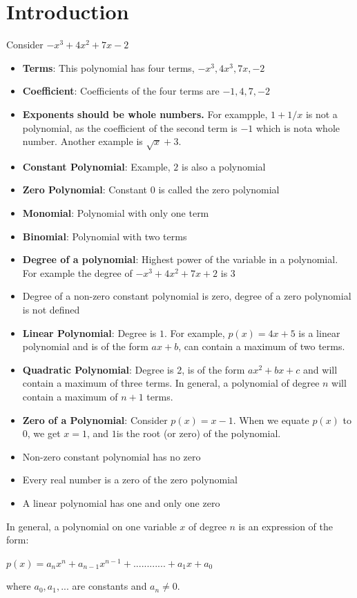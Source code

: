 \documentclass{book}
\begin{document}
	\section{Introduction}
	Consider $-x^3 + 4x^2 +7x -2$
	\begin{itemize}
		\item \textbf{Terms}: This polynomial has four terms, $-x^3, 4x^3, 7x,-2$
		\item \textbf{Coefficient}: Coefficients of the four terms are $-1,4,7,-2$
		\item \textbf{Exponents should be whole numbers.} For exampple, $1 + 1/x$ is not a polynomial, as the coefficient of the second term is $-1$ which is nota whole number. Another example is $\sqrt{x} + 3$.
		\item \textbf{Constant Polynomial}: Example, $2$ is also a polynomial
		\item \textbf{Zero Polynomial}: Constant $0$ is called the zero polynomial
		\item \textbf{Monomial}: Polynomial with only one term
		\item \textbf{Binomial}: Polynomial with two terms
		\item \textbf{Degree of a polynomial}: Highest power of the variable in a polynomial. For example the degree of $-x^3 + 4x^2 + 7x + 2$ is $3$
		\item Degree of a non-zero constant polynomial is zero, degree of a zero polynomial is not defined
		\item \textbf{Linear Polynomial}: Degree is $1$. For example, $p(x) = 4x + 5$ is a linear polynomial and is of the form $ax + b$, can contain a maximum of two terms.
		\item \textbf{Quadratic Polynomial}: Degree is 2, is of the form $ax^2 + bx + c$ and will contain a maximum of three terms. In general, a polynomial of degree $n$ will contain a maximum of $n+1$ terms.
		\item \textbf{Zero of a Polynomial}: Consider $p(x) = x -1$. When we equate $p(x)$ to $0$, we get $x=1$, and $1$is the root (or zero) of the polynomial. 
		\item Non-zero constant polynomial has no zero
		\item Every real number is a zero of the zero polynomial
		\item A linear polynomial has one and only one zero \\
	\end{itemize}
In general, a polynomial on one variable $x$ of	degree $n$ is an expression of the form: \\
	\begin{mdframed}[backgroundcolor=yellow]
		$p(x) = a_nx^n + a_{n-1}x^{n-1} + ............ + a_1x + a_0$
	\end{mdframed}
where $a_0, a_1,...$ are constants and $a_n \neq 0$.
\end{document}

